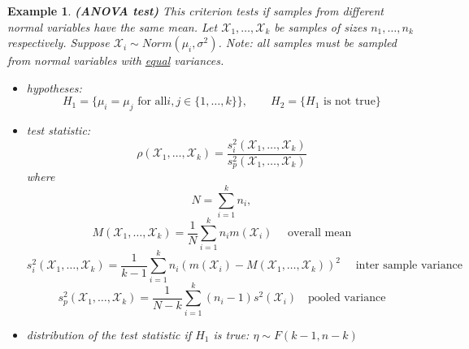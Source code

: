 \documentclass[12pt]{article}
\newtheorem{example}[theorem]{Example}
\begin{document}
\begin{example} \textbf{(ANOVA test)} This criterion tests if samples from
    different normal variables have the same mean. Let
    $\mathscr{X}_1,\ldots,\mathscr{X}_k$ be samples of sizes $n_1,\ldots,n_k$
    respectively. Suppose $\mathscr{X}_i\sim Norm(\mu_i,\sigma^2)$. Note: all
    samples must be sampled from normal variables with \underline{equal}
    variances.
    \begin{itemize}
        \item hypotheses:
              $$
                  H_1=\{\mu_i=\mu_j
                  \mbox{ for all}i,j\in \{1,\ldots,k\} \},
                  \quad\quad H_2=\{H_1\mbox{ is not true}\}
              $$
        \item test statistic:
              $$
                  \rho(\mathscr{X}_1,\ldots,\mathscr{X}_k)
                  =\frac{s_i^2(\mathscr{X}_1,\ldots,\mathscr{X}_k)}
                  {s_p^2(\mathscr{X}_1,\ldots,\mathscr{X}_k)}
              $$
              where
              $$
                  N=\sum_{i=1}^k n_i,
              $$
              $$
                  M(\mathscr{X}_1,\ldots,\mathscr{X}_k)
                  =\frac{1}{N}\sum_{i=1}^k n_i m(\mathscr{X}_i)
                  \quad\mbox{ overall mean}
              $$
              $$
                  s_i^2(\mathscr{X}_1,\ldots,\mathscr{X}_k)
                  =\frac{1}{k-1}\sum_{i=1}^k n_i{(m(\mathscr{X}_i)
                  -M(\mathscr{X}_1,\ldots,\mathscr{X}_k))}^2
                  \quad \mbox{ inter sample variance}
              $$
              $$
                  s_p^2(\mathscr{X}_1,\ldots,\mathscr{X}_k)
                  =\frac{1}{N-k}\sum_{i=1}^k (n_i-1) s^2(\mathscr{X}_i)
                  \quad \mbox{pooled variance}
              $$
        \item distribution of the test statistic if $H_1$ is true:
              $\eta\sim F(k-1, n-k)$
    \end{itemize}
\end{example}
\end{document}
